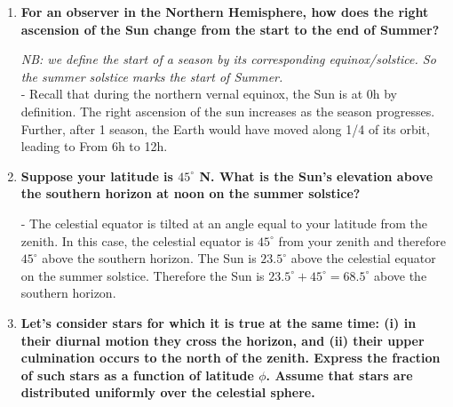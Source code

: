 \documentclass[a4paper,12pt]{extarticle}
\begin{document}
\begin{enumerate}
\item \textbf{For an observer in the Northern Hemisphere, how does the right ascension of the Sun change from the start to the end of Summer?}
\begin{sol}
\textit{NB: we define the start of a season by its corresponding equinox/solstice. So the summer solstice marks the start of Summer.}\\

- Recall that during the northern vernal equinox, the Sun is at 0h by definition. The right ascension of the sun increases as the season progresses. Further, after 1 season, the Earth would have moved along 1/4 of its orbit, leading to From 6h to 12h.	
\end{sol}

\item \textbf{Suppose your latitude is $45^\circ$ N. What is the Sun's elevation above the southern horizon at noon on the summer solstice?}
\begin{sol}
- The celestial equator is tilted at an angle equal to your latitude from the zenith. In this case, the celestial equator is $45^\circ$ from your zenith and therefore $45^\circ$ above the southern horizon. The Sun is $23.5^\circ$ above the celestial equator on the summer solstice. Therefore the Sun is $23.5^\circ+ 45^\circ= 68.5^\circ$ above the southern horizon.
\end{sol}

\item \textbf{Let’s consider stars for which it is true at the same time: (i) in their diurnal motion they cross the horizon, and (ii) their upper culmination occurs to the north of the zenith. Express the fraction of such stars as a function of latitude $\phi$. Assume that stars are distributed uniformly over the celestial sphere.}


\end{enumerate}
\end{document}
